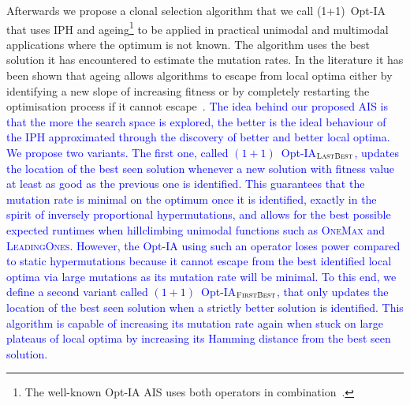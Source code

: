 \documentclass[lettersize,journal]{IEEEtran}
\newcommand{\new}[1]{\textcolor{blue}{#1}}
\begin{document}
Afterwards we propose a clonal selection algorithm that we call (1+1)~Opt-IA
that uses IPH and ageing\footnote{The well-known Opt-IA AIS uses both operators in combination~\cite{CutelloNicosiaPavoneTimmis2007}.} \cite{CutelloNicosiaPavoneTimmis2007} to be applied in practical unimodal and multimodal applications where the optimum is not known. 
The algorithm uses the best solution it has encountered to estimate the mutation rates.
In the literature it has been shown that ageing allows algorithms to escape from local optima either by identifying a new slope of increasing fitness or by completely restarting the optimisation process if it cannot escape~\cite{OlivetoSudholt2014ageing,CorusOlivetoYazdaniGECCO2017,CorusOlivetoYazdaniAIJ2019,HorobaJansenZarges09,JansenZarges2011}. 
\new{The idea behind our proposed AIS is that the more the search space is explored, the better is the ideal behaviour of the IPH approximated through the discovery of better and better local optima.
We propose two variants. The first one, called $(1+1)$~Opt-IA$_{\textsc{LastBest}}$, updates the location of the best seen solution whenever a new solution with fitness value at least as good as the previous one is identified. This guarantees that the mutation rate is minimal on the optimum once it is identified, exactly in the spirit of inversely proportional hypermutations, and allows for the best possible expected runtimes when hillclimbing unimodal functions such as \textsc{OneMax} and \textsc{LeadingOnes}. However, the Opt-IA using such an operator loses power compared to static hypermutations because it cannot escape from the best identified local optima via large mutations as its mutation rate will be minimal. To this end, we define a second variant called $(1+1)$~Opt-IA$_{\textsc{FirstBest}}$, that only updates the location of the best seen solution when a strictly better solution is identified. This algorithm is capable of increasing its mutation rate again when stuck on large plateaus of local optima by increasing its Hamming distance from the best seen solution.
}
\end{document}
